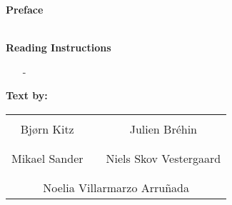 \textbf{\huge{Preface}}
\\
\\

\vspace{-12 pt}
\lipsum[3]

\textbf{Reading Instructions}
\vspace{-10 pt}
\begin{itemize}
\item[-] \lipsum[6]
\end{itemize}

%
\textbf{Text by:}\\
\vspace{-12 pt}
\begin{table}[H]
	\centering
		\begin{tabular}{c c c}
			\underline{\phantom{JAERJAERJAERJAERGO}} & \phantom{cookies} & \underline{\phantom{JAERJAERJAERJAERGO}} \\
			Bjørn Kitz			& \phantom{cookies} & Julien Br\'ehin		\\
			&&\\
			\underline{\phantom{JAERJAERJAERJAERGO}} & \phantom{cookies} & \underline{\phantom{JAERJAERJAERJAERGO}} \\
			Mikael Sander			& \phantom{cookies} & Niels Skov Vestergaard		\\
			&&\\
	    \multicolumn{3}{c}{\underline{\phantom{JAERJAERJAERJAERGO}}}\\
	    \multicolumn{3}{c}{Noelia Villarmarzo Arruñada}\\				
		\end{tabular}
\end{table}
\pagebreak